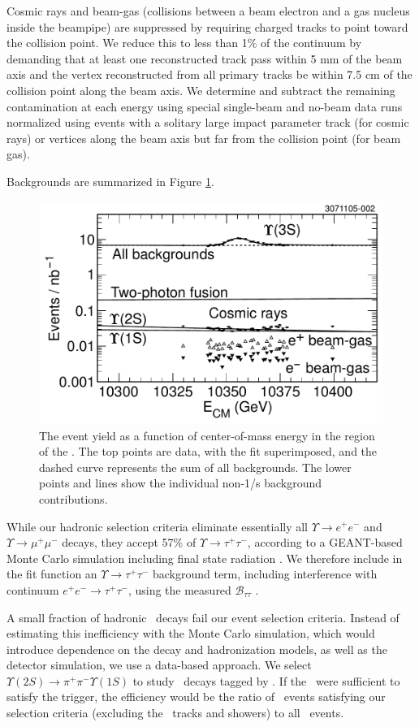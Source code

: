 \documentclass[aps,prl,superscriptaddress,showpacs,floatfix]{revtex4}
\begin{document}
Cosmic rays and beam-gas (collisions between a beam electron and a gas
nucleus inside the beampipe) are suppressed by requiring charged
tracks to point toward the collision point.  We reduce this to less
than 1\% of the continuum by demanding that at least one reconstructed
track pass within 5 mm of the beam axis and the vertex reconstructed
from all primary tracks be within 7.5 cm of the collision point along
the beam axis.  We determine and subtract the remaining contamination
at each energy using special single-beam and no-beam data runs
normalized using events with a solitary large impact parameter track
(for cosmic rays) or vertices along the beam axis but far from the
collision point (for beam gas).

Backgrounds are summarized in Figure \ref{fig:backgrounds}.

\begin{figure}
  \includegraphics[width=0.5\linewidth]{backgrounds}
  \caption{\label{fig:backgrounds} The event yield as a function of
center-of-mass energy in the region of the \usss.  The top points are
data, with the fit superimposed, and the dashed curve represents the
sum of all backgrounds.  The lower points and lines show the
individual non-1/s background contributions.}
\end{figure}

While our hadronic selection criteria eliminate essentially all
$\Upsilon \to e^+e^-$ and $\Upsilon \to \mu^+\mu^-$ decays, they
accept 57\% of $\Upsilon \to \tau^+\tau^-$, according to a GEANT-based
Monte Carlo simulation \cite{mc} including final state radiation
\cite{photos}.  We therefore include in the fit function an $\Upsilon
\to \tau^+\tau^-$ background term, including interference with
continuum $e^+e^- \to \tau^+\tau^-$, using the measured ${\mathcal
B}_{\tau\tau}$ \cite{jean}.

A small fraction of hadronic \ups\ decays fail our event selection
criteria.  Instead of estimating this inefficiency with the Monte
Carlo simulation, which would introduce dependence on the decay and
hadronization models, as well as the detector simulation, we use a
data-based approach.  We select $\Upsilon(2S) \to \pi^+\pi^-
\Upsilon(1S)$ to study \us\ decays tagged by \pipi.  If the \pipi\
were sufficient to satisfy the trigger, the efficiency would be the
ratio of \us\ events satisfying our selection criteria (excluding the
\pipi\ tracks and showers) to all \us\ events.
\end{document}

